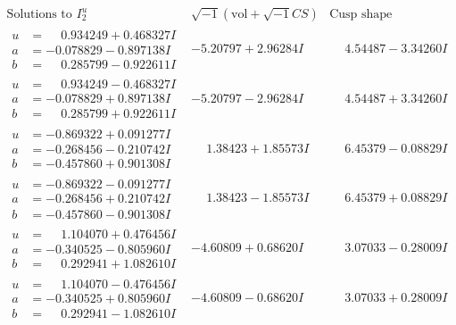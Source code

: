 \documentclass[1p]{elsarticle_modified}
\theoremstyle{definition}
\newcommand{\I}{\sqrt{-1}}
\begin{document}
$$\begin{array}{c|c|c}  
\text{Solutions to }I^u_{2}& \I (\text{vol} + \sqrt{-1}CS) & \text{Cusp shape}\\
 \hline 
\begin{aligned}
u &= \phantom{-}0.934249 + 0.468327 I \\
a &= -0.078829 - 0.897138 I \\
b &= \phantom{-}0.285799 - 0.922611 I\end{aligned}
 & -5.20797 + 2.96284 I & \phantom{-}4.54487 - 3.34260 I \\ \hline\begin{aligned}
u &= \phantom{-}0.934249 - 0.468327 I \\
a &= -0.078829 + 0.897138 I \\
b &= \phantom{-}0.285799 + 0.922611 I\end{aligned}
 & -5.20797 - 2.96284 I & \phantom{-}4.54487 + 3.34260 I \\ \hline\begin{aligned}
u &= -0.869322 + 0.091277 I \\
a &= -0.268456 - 0.210742 I \\
b &= -0.457860 + 0.901308 I\end{aligned}
 & \phantom{-}1.38423 + 1.85573 I & \phantom{-}6.45379 - 0.08829 I \\ \hline\begin{aligned}
u &= -0.869322 - 0.091277 I \\
a &= -0.268456 + 0.210742 I \\
b &= -0.457860 - 0.901308 I\end{aligned}
 & \phantom{-}1.38423 - 1.85573 I & \phantom{-}6.45379 + 0.08829 I \\ \hline\begin{aligned}
u &= \phantom{-}1.104070 + 0.476456 I \\
a &= -0.340525 - 0.805960 I \\
b &= \phantom{-}0.292941 + 1.082610 I\end{aligned}
 & -4.60809 + 0.68620 I & \phantom{-}3.07033 - 0.28009 I \\ \hline\begin{aligned}
u &= \phantom{-}1.104070 - 0.476456 I \\
a &= -0.340525 + 0.805960 I \\
b &= \phantom{-}0.292941 - 1.082610 I\end{aligned}
 & -4.60809 - 0.68620 I & \phantom{-}3.07033 + 0.28009 I \\ \hline\begin{aligned}

\end{aligned}
\end{array}$$
\end{document}
